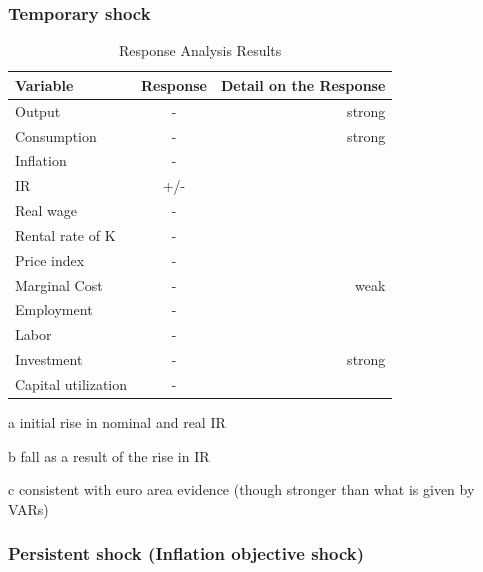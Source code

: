 \documentclass{article}
\begin{document}
\subsubsection{Temporary shock}
\begin{table}[H]    
    \centering  
    \begin{threeparttable}    
    \caption{Response Analysis Results}    
    \label{tab:response_analysis}    
    \begin{tabular}{lcr}    
        \toprule    
        \textbf{Variable} & \textbf{Response} & \textbf{Detail on the Response} \\    
        \midrule    
        Output\tnote{b} & - &  strong  \\    
        Consumption\tnote{b} & - & strong\\ 
        Inflation & - & \\
        IR\tnote{a} & +/- & \\   
        Real wage\tnote{c} & - & \\  
        Rental rate of K & - & \\
        Price index & - & \\
        Marginal Cost & - & weak  \\
        Employment & - &  \\   
        Labor & - & \\
        Investment\tnote{b} & - & strong\\
        Capital utilization & - & \\
        \bottomrule    
    \end{tabular}  
    \begin{tablenotes}  
        \small  
        \item[a] initial rise in nominal and real IR
        \item[b] fall as a result of the rise in IR
        \item[c] consistent with euro area evidence (though stronger than what is given by VARs)
    \end{tablenotes}  
    \end{threeparttable}    
\end{table} 

\subsubsection{Persistent shock (Inflation objective shock)}
\end{document}
